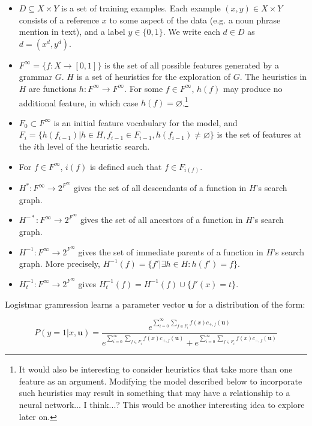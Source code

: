 \documentclass[11pt,letterpaper]{article}
\begin{document}
\begin{itemize}
\item $D\subseteq X\times Y$ 
is a set of training examples. Each example 
$(x,y)\in X\times Y$ 
consists of a reference $x$ to some aspect 
of the data (e.g. a noun 
phrase mention in text), and a label $y\in \{0,1\}$. 
We write each $d\in D$ as $d=(x^d,y^d)$.
\item $F^\infty=\{f:X\rightarrow [0,1]\}$ is the set of all 
possible features generated by a grammar
$G$.  $H$ is a set of heuristics for the exploration of $G$.  The
heuristics in $H$ are functions 
$h:F^\infty\rightarrow F^\infty$.  For some $f\in F^\infty$, 
$h(f)$ may produce no additional feature, in which case  
$h(f)=\varnothing$.\footnote{It would also be
interesting to consider heuristics that take 
more than one feature
as an argument.  Modifying the model described below to incorporate
such heuristics may result in something that may have a relationship
to a neural network... I think...?  This would be 
another interesting idea to 
explore later on.}
\item $F_0\subset F^\infty$ is an initial feature vocabulary for the model,
and $F_i=\{h(f_{i-1})|h\in H, f_{i-1}\in F_{i-1}, 
h(f_{i-1})\neq\varnothing\}$ 
is the set of features
at the $i$th level of the heuristic search.
\item For $f\in F^\infty$, $i(f)$ is defined such that $f\in F_{i(f)}$.
\item $H^*:F^\infty\rightarrow 2^{F^\infty}$ gives the set 
of all descendants of a 
function in $H$'s search graph.
\item $H^{-*}:F^\infty\rightarrow 2^{F^\infty}$ gives the set 
of all ancestors of
a function in $H$'s search graph.
\item $H^{-1}:F^\infty\rightarrow 2^{F^\infty}$ gives the set
of immediate parents of a function in $H$'s search graph.  More
precisely, $H^{-1}(f)=\{f'|\exists h\in H: h(f')=f\}$.
\item $H^{-1}_t:F^\infty\rightarrow 2^{F^\infty}$ gives
$H^{-1}_t(f)=H^{-1}(f)\cup \{f'(x)=t\}$.

\end{itemize}

Logistmar gramression learns a parameter vector $\mathbf{u}$
for a distribution of the form:

\begin{equation}
\label{eq:distribution}
P(y=1|x,\mathbf{u})=
\frac{e^{\sum_{i=0}^\infty\sum_{f\in F_i}f(x)c_{+,f}(\mathbf{u})}}
{e^{\sum_{i=0}^\infty\sum_{f\in F_i}f(x)c_{+,f}(\mathbf{u})}
 + e^{\sum_{i=0}^\infty\sum_{f\in F_i}f(x)c_{-,f}(\mathbf{u})}}
\end{equation}
\end{document}
